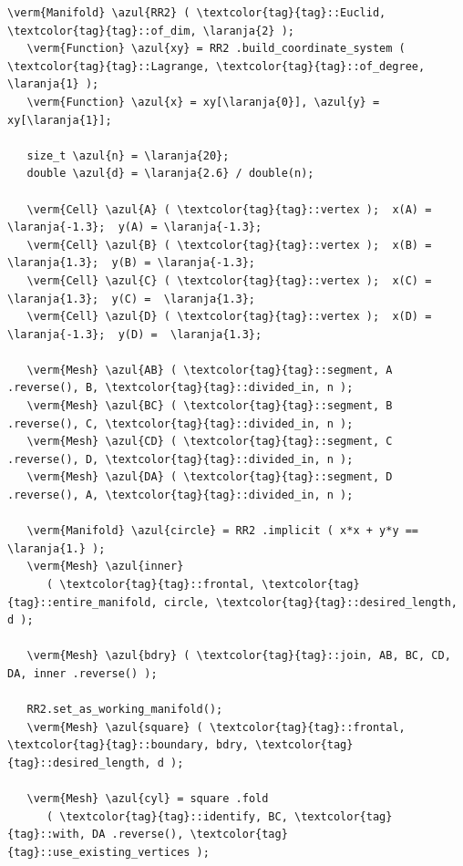 \begin{Verbatim}[commandchars=\\\{\},formatcom=\small\tt,frame=single,
   label=parag-\ref{\numb section 7.\numb parag 19}.cpp,rulecolor=\color{moldura},
   baselinestretch=0.94,framesep=2mm                                             ]
   \verm{Manifold} \azul{RR2} ( \textcolor{tag}{tag}::Euclid, \textcolor{tag}{tag}::of_dim, \laranja{2} );
   \verm{Function} \azul{xy} = RR2 .build_coordinate_system ( \textcolor{tag}{tag}::Lagrange, \textcolor{tag}{tag}::of_degree, \laranja{1} );
   \verm{Function} \azul{x} = xy[\laranja{0}], \azul{y} = xy[\laranja{1}];

   size_t \azul{n} = \laranja{20};
   double \azul{d} = \laranja{2.6} / double(n);

   \verm{Cell} \azul{A} ( \textcolor{tag}{tag}::vertex );  x(A) = \laranja{-1.3};  y(A) = \laranja{-1.3};
   \verm{Cell} \azul{B} ( \textcolor{tag}{tag}::vertex );  x(B) =  \laranja{1.3};  y(B) = \laranja{-1.3};
   \verm{Cell} \azul{C} ( \textcolor{tag}{tag}::vertex );  x(C) =  \laranja{1.3};  y(C) =  \laranja{1.3};
   \verm{Cell} \azul{D} ( \textcolor{tag}{tag}::vertex );  x(D) = \laranja{-1.3};  y(D) =  \laranja{1.3};

   \verm{Mesh} \azul{AB} ( \textcolor{tag}{tag}::segment, A .reverse(), B, \textcolor{tag}{tag}::divided_in, n );
   \verm{Mesh} \azul{BC} ( \textcolor{tag}{tag}::segment, B .reverse(), C, \textcolor{tag}{tag}::divided_in, n );
   \verm{Mesh} \azul{CD} ( \textcolor{tag}{tag}::segment, C .reverse(), D, \textcolor{tag}{tag}::divided_in, n );
   \verm{Mesh} \azul{DA} ( \textcolor{tag}{tag}::segment, D .reverse(), A, \textcolor{tag}{tag}::divided_in, n );

   \verm{Manifold} \azul{circle} = RR2 .implicit ( x*x + y*y == \laranja{1.} );
   \verm{Mesh} \azul{inner}
      ( \textcolor{tag}{tag}::frontal, \textcolor{tag}{tag}::entire_manifold, circle, \textcolor{tag}{tag}::desired_length, d );

   \verm{Mesh} \azul{bdry} ( \textcolor{tag}{tag}::join, AB, BC, CD, DA, inner .reverse() );

   RR2.set_as_working_manifold();
   \verm{Mesh} \azul{square} ( \textcolor{tag}{tag}::frontal, \textcolor{tag}{tag}::boundary, bdry, \textcolor{tag}{tag}::desired_length, d );

   \verm{Mesh} \azul{cyl} = square .fold
      ( \textcolor{tag}{tag}::identify, BC, \textcolor{tag}{tag}::with, DA .reverse(), \textcolor{tag}{tag}::use_existing_vertices );
\end{Verbatim}

